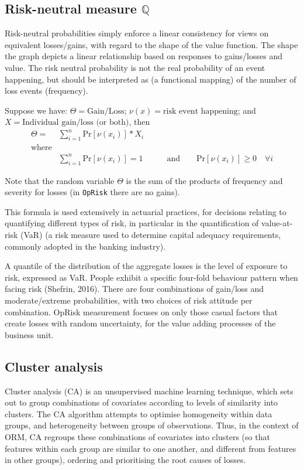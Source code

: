 \documentclass{DissertateUSU}
\begin{document}
\subsection{Risk-neutral measure $\mathbb{Q}$}

Risk-neutral probabilities simply enforce a linear consistency for views
on equivalent losses/gains, with regard to the shape of the value
function. The shape the graph depicts a linear relationship based on
responses to gains/losses and value. The risk neutral probability is not
the real probability of an event happening, but should be interpreted as
(a functional mapping) of the number of loss events (frequency).\medskip

Suppose we have: \(\Theta = \mbox{Gain/Loss}\);
\(\nu(x) = \mbox{risk event happening}\); and
\(X = \mbox{Individual gain/loss (or both)}\), then
\begin{eqnarray}\label{eqn3}
\Theta = &\sum_{i=1}^{n}\mbox{Pr}[\nu (x_{i})]*X_i & \\
 \mbox{where} \nonumber\\
&\sum_{i=1}^{n}\mbox{Pr}[\nu (x_{i})] = 1 &\qquad \mbox{and} \qquad \mbox{Pr}[\nu (x_{i})] \geq 0 \quad \forall i\nonumber
\end{eqnarray}

Note that the random variable \(\Theta\) is the sum of the products of
frequency and severity for losses (in \texttt{OpRisk} there are no
gains).\medskip

This formula is used extensively in actuarial practices, for decisions
relating to quantifying different types of risk, in particular in the
quantification of value-at-risk (VaR) (a risk measure used to determine
capital adequacy requirements, commonly adopted in the banking
industry).\medskip

A quantile of the distribution of the aggregate losses is the level of
exposure to risk, expressed as VaR. People exhibit a specific four-fold
behaviour pattern when facing risk (Shefrin, 2016). There are four
combinations of gain/loss and moderate/extreme probabilities, with two
choices of risk attitude per combination. OpRisk measurement focuses on
only those casual factors that create losses with random uncertainty,
for the value adding processes of the business unit.

\subsection{Cluster analysis}

Cluster analysis (CA) is an unsupervised machine learning technique,
which sets out to group combinations of covariates according to levels
of similarity into clusters. The CA algorithm attempts to optimise
homogeneity within data groups, and heterogeneity between groups of
observations. Thus, in the context of ORM, CA regroups these
combinations of covariates into clusters (so that features within each
group are similar to one another, and different from features in other
groups), ordering and prioritising the root causes of losses.\medskip
\end{document}
